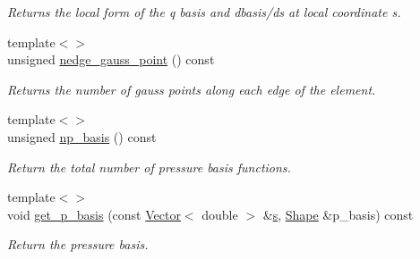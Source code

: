 \begin{DoxyCompactItemize}
\begin{DoxyCompactList}\small\item\em Returns the local form of the q basis and dbasis/ds at local coordinate s. \end{DoxyCompactList}\item 
{\footnotesize template$<$$>$ }\\unsigned \hyperlink{classoomph_1_1TPoroelasticityElement_a8dabd82d779752499883ac3fdd36d5d3}{nedge\+\_\+gauss\+\_\+point} () const
\begin{DoxyCompactList}\small\item\em Returns the number of gauss points along each edge of the element. \end{DoxyCompactList}\item 
{\footnotesize template$<$$>$ }\\unsigned \hyperlink{classoomph_1_1TPoroelasticityElement_a380340d846ca1c8982adef1085209d1b}{np\+\_\+basis} () const
\begin{DoxyCompactList}\small\item\em Return the total number of pressure basis functions. \end{DoxyCompactList}\item 
{\footnotesize template$<$$>$ }\\void \hyperlink{classoomph_1_1TPoroelasticityElement_a331ed84e73c867f6755dcc2f50a167ce}{get\+\_\+p\+\_\+basis} (const \hyperlink{classoomph_1_1Vector}{Vector}$<$ double $>$ \&\hyperlink{cfortran_8h_ab7123126e4885ef647dd9c6e3807a21c}{s}, \hyperlink{classoomph_1_1Shape}{Shape} \&p\+\_\+basis) const
\begin{DoxyCompactList}\small\item\em Return the pressure basis. \end{DoxyCompactList}\end{DoxyCompactItemize}
